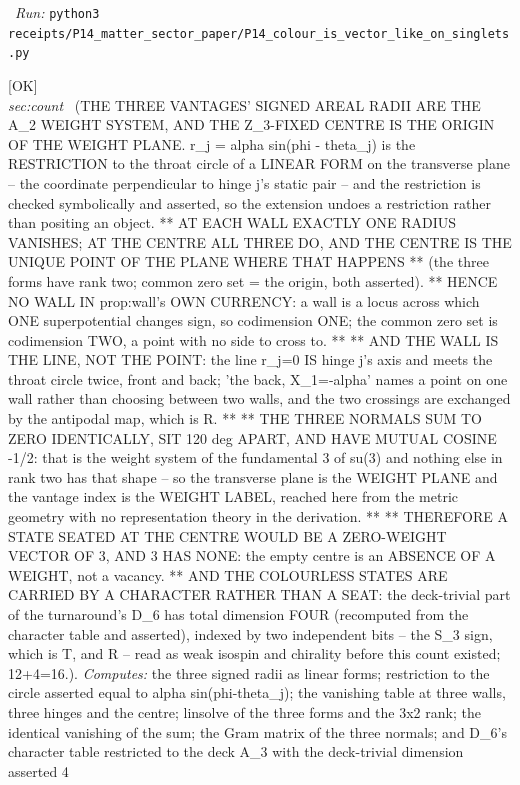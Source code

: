 \begin{description}
\ \emph{Run:} \texttt{python3 receipts/P14\_matter\_sector\_paper/P14\_colour\_is\_vector\_like\_on\_singlets.py}
\item[\label{rcpt:P14_the_centre_is_the_weight_origin}\texttt{P14\_the\_centre\_is\_the\_weight\_origin}]\hfill\textsf{[OK]}\\
\textit{sec:count} \ (THE THREE VANTAGES' SIGNED AREAL RADII ARE THE A\_2 WEIGHT SYSTEM, AND THE Z\_3-FIXED CENTRE IS THE ORIGIN OF THE WEIGHT PLANE. r\_j = alpha sin(phi - theta\_j) is the RESTRICTION to the throat circle of a LINEAR FORM on the transverse plane -- the coordinate perpendicular to hinge j's static pair -- and the restriction is checked symbolically and asserted, so the extension undoes a restriction rather than positing an object. ** AT EACH WALL EXACTLY ONE RADIUS VANISHES; AT THE CENTRE ALL THREE DO, AND THE CENTRE IS THE UNIQUE POINT OF THE PLANE WHERE THAT HAPPENS ** (the three forms have rank two; common zero set = the origin, both asserted). ** HENCE NO WALL IN prop:wall's OWN CURRENCY: a wall is a locus across which ONE superpotential changes sign, so codimension ONE; the common zero set is codimension TWO, a point with no side to cross to. ** ** AND THE WALL IS THE LINE, NOT THE POINT: the line r\_j=0 IS hinge j's axis and meets the throat circle twice, front and back; 'the back, X\_1=-alpha' names a point on one wall rather than choosing between two walls, and the two crossings are exchanged by the antipodal map, which is R. ** ** THE THREE NORMALS SUM TO ZERO IDENTICALLY, SIT 120 deg APART, AND HAVE MUTUAL COSINE -1/2: that is the weight system of the fundamental 3 of su(3) and nothing else in rank two has that shape -- so the transverse plane is the WEIGHT PLANE and the vantage index is the WEIGHT LABEL, reached here from the metric geometry with no representation theory in the derivation. ** ** THEREFORE A STATE SEATED AT THE CENTRE WOULD BE A ZERO-WEIGHT VECTOR OF 3, AND 3 HAS NONE: the empty centre is an ABSENCE OF A WEIGHT, not a vacancy. ** AND THE COLOURLESS STATES ARE CARRIED BY A CHARACTER RATHER THAN A SEAT: the deck-trivial part of the turnaround's D\_6 has total dimension FOUR (recomputed from the character table and asserted), indexed by two independent bits -- the S\_3 sign, which is T, and R -- read as weak isospin and chirality before this count existed; 12+4=16.). 
\emph{Computes:} the three signed radii as linear forms; restriction to the circle asserted equal to alpha sin(phi-theta\_j); the vanishing table at three walls, three hinges and the centre; linsolve of the three forms and the 3x2 rank; the identical vanishing of the sum; the Gram matrix of the three normals; and D\_6's character table restricted to the deck A\_3 with the deck-trivial dimension asserted 4

\end{description}
